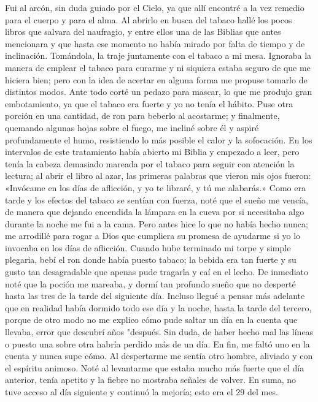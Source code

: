 \documentclass{novela}
\begin{document}
    Fui al arcón, sin duda guiado por el Cielo, ya que allí encontré a la vez remedio para el cuerpo y para el alma. Al abrirlo en busca del tabaco hallé los pocos libros que salvara del naufragio, y entre ellos una de las Biblias que antes mencionara y que hasta ese momento no había mirado por falta de tiempo y de inclinación. Tomándola, la traje juntamente con el tabaco a mi mesa.
    Ignoraba la manera de emplear el tabaco para curarme y ni siquiera estaba seguro de que me hiciera bien; pero con la idea de acertar en alguna forma me propuse tomarlo de distintos modos. Ante todo corté un pedazo para mascar, lo que me produjo gran embotamiento, ya que el tabaco era fuerte y yo no tenía el hábito. Puse otra porción en una cantidad, de ron para beberlo al acostarme; y finalmente, quemando algunas hojas sobre el fuego, me incliné sobre él y aspiré profundamente el humo, resistiendo lo más posible el calor y la sofocación.
    En los intervalos de este tratamiento había abierto mi Biblia y empezado a leer, pero tenía la cabeza demasiado mareada por el tabaco para seguir con atención la lectura; al abrir el libro al azar, las primeras palabras que vieron mis ojos fueron: «Invócame en los días de aflicción, y yo te libraré, y tú me alabarás.»
    Como era tarde y los efectos del tabaco se sentían con fuerza, noté que el sueño me vencía, de manera que dejando encendida la lámpara en la cueva por si necesitaba algo durante la noche me fui a la cama. Pero antes hice lo que no había hecho nunca; me arrodillé para rogar a Dios que cumpliera su promesa de ayudarme si yo lo invocaba en los días de aflicción. Cuando hube terminado mi torpe y simple plegaria, bebí el ron donde había puesto tabaco; la bebida era tan fuerte y su gusto tan desagradable que apenas pude tragarla y caí en el lecho. De inmediato noté que la poción me mareaba, y dormí tan profundo sueño que no desperté hasta las tres de la tarde del siguiente día. Incluso llegué a pensar más adelante que en realidad había dormido todo ese día y la noche, hasta la tarde del tercero, porque de otro modo no me explico cómo pude saltar un día en la cuenta que llevaba, error que descubrí años "después. Sin duda, de haber hecho mal las líneas o puesto una sobre otra habría perdido más de un día. En fin, me faltó uno en la cuenta y nunca supe cómo.
    Al despertarme me sentía otro hombre, aliviado y con el espíritu animoso. Noté al levantarme que estaba mucho más fuerte que el día anterior, tenía apetito y la fiebre no mostraba señales de volver. En suma, no tuve acceso al día siguiente y continuó la mejoría; esto era el 29 del mes.
\end{document}
